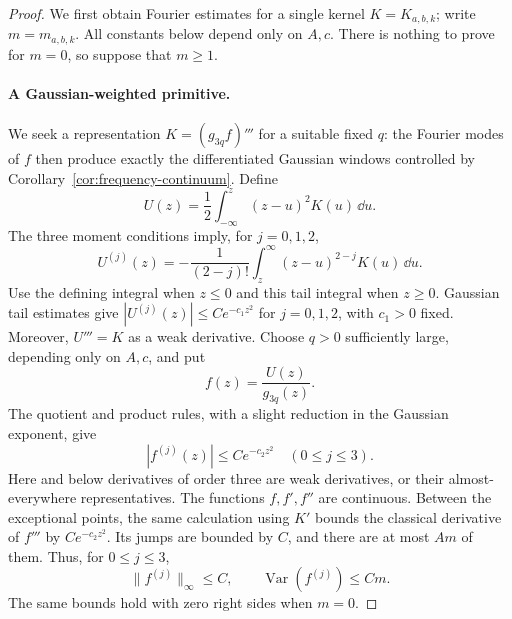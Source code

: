 \begin{proof}
We first obtain Fourier estimates for a single kernel $K=K_{a,b,k}$;
write $m=m_{a,b,k}$.  All constants below depend only on $A,c$.
There is nothing to prove for $m=0$, so suppose that $m\ge1$.

\paragraph{A Gaussian-weighted primitive.}
We seek a representation $K=(g_{3q}f)'''$ for a suitable fixed $q$:
the Fourier modes of $f$ then produce exactly the differentiated
Gaussian windows controlled by Corollary~\ref{cor:frequency-continuum}.
Define
\[
 U(z)=\frac12\int_{-\infty}^z(z-u)^2K(u)\,\dd u.
\]
The three moment conditions imply, for $j=0,1,2$,
\[
 U^{(j)}(z)
 =-\frac1{(2-j)!}\int_z^\infty(z-u)^{2-j}K(u)\,\dd u.
\]
Use the defining integral when $z\le0$ and this tail integral when
$z\ge0$.  Gaussian tail estimates give
$|U^{(j)}(z)|\le C e^{-c_1z^2}$ for $j=0,1,2$, with $c_1>0$ fixed.
Moreover, $U'''=K$ as a weak derivative.
Choose $q>0$ sufficiently large, depending only on $A,c$, and put
\[
 f(z)=\frac{U(z)}{g_{3q}(z)}.
\]
The quotient and product rules, with a slight reduction in the
Gaussian exponent, give
\begin{equation}
 |f^{(j)}(z)|\le C e^{-c_2z^2}\quad(0\le j\le3).
 \label{eq:rough-f-decay}
\end{equation}
Here and below derivatives of order three are weak derivatives, or
their almost-everywhere representatives.  The functions $f,f',f''$
are continuous.  Between the exceptional points, the same calculation
using $K'$ bounds the classical derivative of $f'''$ by
$Ce^{-c_2z^2}$.  Its jumps are bounded by $C$, and there are at most
$Am$ of them.  Thus, for $0\le j\le3$,
\begin{equation}
 \|f^{(j)}\|_\infty\le C,
 \qquad \operatorname{Var}(f^{(j)})\le Cm.
 \label{eq:rough-f-bv}
\end{equation}
The same bounds hold with zero right sides when $m=0$.


\end{proof}
